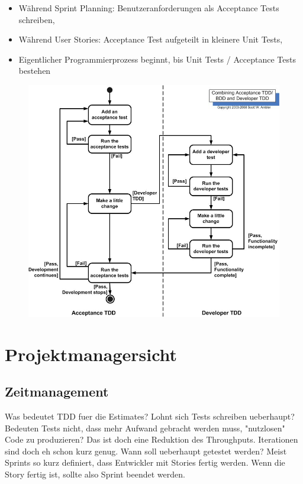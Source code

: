 \documentclass[12pt,DIV14,BCOR10mm,a4paper,twoside,parskip=half-,headsepline,headinclude,english,ngerman,bibliography=totocnumbered]{scrreprt}
\begin{document}
\begin{itemize}
    \item Während Sprint Planning: Benutzeranforderungen als Acceptance Tests schreiben,
    \item Während User Stories: Acceptance Test aufgeteilt in kleinere Unit Tests,
    \item Eigentlicher Programmierprozess beginnt, bis Unit Tests / Acceptance Tests bestehen
\end{itemize}

\begin{figure}[!htb]
    \includegraphics[width=\textwidth,height=0.8\textheight,keepaspectratio]{./images/atdd.jpg}
    \autocite{astels_2003}
\end{figure}

\section{Projektmanagersicht}
\subsection{Zeitmanagement}

Was bedeutet TDD fuer die Estimates?
Lohnt sich Tests schreiben ueberhaupt?
Bedeuten Tests nicht, dass mehr Aufwand gebracht werden muss, "nutzlosen" Code zu produzieren?
Das ist doch eine Reduktion des Throughputs.
Iterationen sind doch eh schon kurz genug.
Wann soll ueberhaupt getestet werden?
Meist Sprints so kurz definiert, dass Entwickler mit Stories fertig werden.
Wenn die Story fertig ist, sollte also Sprint beendet werden.
\end{document}
